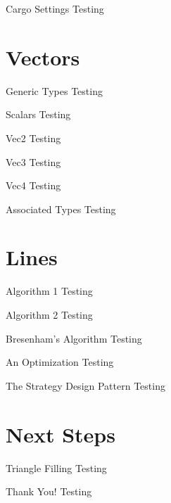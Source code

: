 \documentclass{beamer}
\begin{document}
\begin{frame}{Cargo Settings}
    Testing
\end{frame}


\section{Vectors}
\begin{frame}{Generic Types}
    Testing
\end{frame}

\begin{frame}{Scalars}
    Testing
\end{frame}

\begin{frame}{Vec2}
    Testing
\end{frame}

\begin{frame}{Vec3}
    Testing
\end{frame}

\begin{frame}{Vec4}
    Testing
\end{frame}

\begin{frame}{Associated Types}
    Testing
\end{frame}


\section{Lines}
\begin{frame}{Algorithm 1}
    Testing
\end{frame}

\begin{frame}{Algorithm 2}
    Testing
\end{frame}

\begin{frame}{Bresenham's Algorithm}
    Testing
\end{frame}

\begin{frame}{An Optimization}
    Testing
\end{frame}

\begin{frame}{The Strategy Design Pattern}
    Testing
\end{frame}


\section{Next Steps}
\begin{frame}{Triangle Filling}
    Testing
\end{frame}

\begin{frame}{Thank You!}
    Testing
\end{frame}
\end{document}
